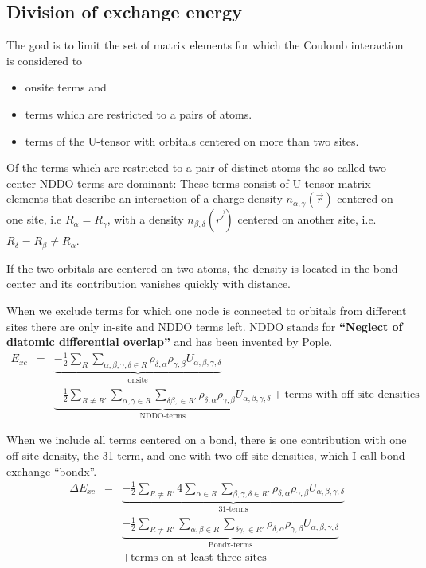 \documentclass[11pt,a4paper]{report}
\begin{document}
\subsection{Division of exchange energy}
The goal is to limit the set of matrix elements for which the Coulomb
interaction is considered to 
\begin{itemize}
\item onsite terms and 
\item terms which are restricted to a pairs of atoms.
\item terms of the U-tensor with orbitals centered on more than two
  sites.
\end{itemize}

Of the terms which are restricted to a pair of distinct atoms the
so-called two-center NDDO terms are dominant: These terms consist of
U-tensor matrix elements that describe an interaction of a charge
density $n_{\alpha,\gamma}(\vec{r})$ centered on one site, i.e
$R_\alpha=R_\gamma$, with a density $n_{\beta,\delta}(\vec{r'})$
centered on another site, i.e. $R_\delta=R_\beta\neq R_\alpha$.

If the two orbitals are centered on two atoms, the density is located
in the bond center and its contribution vanishes quickly with
distance.

When we exclude terms for which one node is connected to orbitals from
different sites there are only in-site and NDDO terms left. NDDO
stands for \textbf{``Neglect of diatomic differential overlap''} and
has been invented by Pople.
\begin{eqnarray}
E_{xc}&=&
\underbrace{
-\frac{1}{2}
\sum_R\sum_{\alpha,\beta,\gamma,\delta\in R}
\rho_{\delta,\alpha}\rho_{\gamma,\beta}U_{\alpha,\beta,\gamma,\delta}
}_{\text{onsite}}
\nonumber\\
&&
\underbrace{
-\frac{1}{2}
\sum_{R\neq R'}
\sum_{\alpha,\gamma\in R}\sum_{\delta\beta,\in R'}
\rho_{\delta,\alpha}\rho_{\gamma,\beta}U_{\alpha,\beta,\gamma,\delta}
}_{\text{NDDO-terms}}
+\text{terms with off-site densities}
\end{eqnarray}

When we include all terms centered on a bond, there is one contribution
with one off-site density, the 31-term, and one with two off-site
densities, which I call bond exchange ``bondx''.
\begin{eqnarray}
\Delta E_{xc}
&=&
\underbrace{
-\frac{1}{2}
\sum_{R\neq R'}
4\sum_{\alpha\in R}\sum_{\beta,\gamma,\delta\in R'}
\rho_{\delta,\alpha}\rho_{\gamma,\beta}U_{\alpha,\beta,\gamma,\delta}
}_{\text{31-terms}}
\nonumber\\
&&
\underbrace{
-\frac{1}{2}
\sum_{R\neq R'}
\sum_{\alpha,\beta\in R}\sum_{\delta\gamma,\in R'}
\rho_{\delta,\alpha}\rho_{\gamma,\beta}U_{\alpha,\beta,\gamma,\delta}
}_{\text{Bondx-terms}}
\nonumber\\
&&+\text{terms on at least three sites}
\end{eqnarray}
\end{document}
